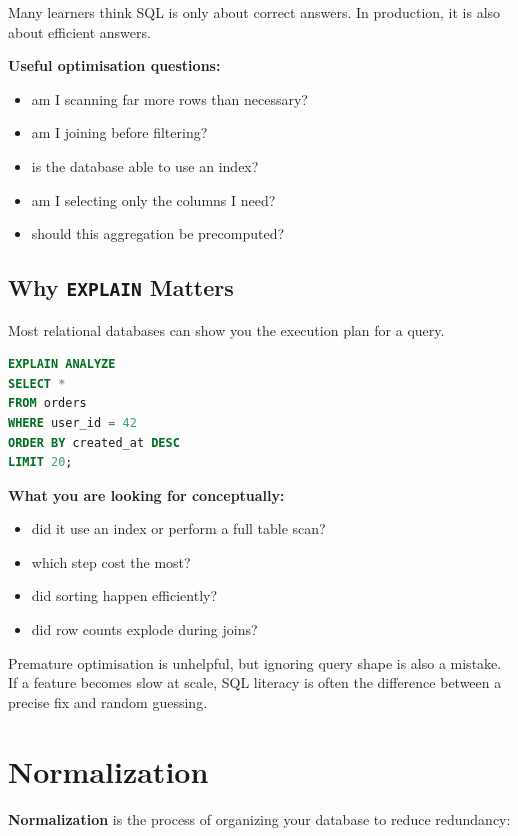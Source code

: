 \documentclass[12pt, a4paper, oneside]{book}
\begin{document}
Many learners think SQL is only about correct answers. In production, it is also about efficient answers.

\textbf{Useful optimisation questions:}
\begin{itemize}[leftmargin=2em]
    \item am I scanning far more rows than necessary?
    \item am I joining before filtering?
    \item is the database able to use an index?
    \item am I selecting only the columns I need?
    \item should this aggregation be precomputed?
\end{itemize}

\subsection{Why \texttt{EXPLAIN} Matters}
Most relational databases can show you the execution plan for a query.

\begin{lstlisting}[language=SQL, caption={Inspecting a query plan}]
EXPLAIN ANALYZE
SELECT *
FROM orders
WHERE user_id = 42
ORDER BY created_at DESC
LIMIT 20;
\end{lstlisting}

\textbf{What you are looking for conceptually:}
\begin{itemize}[leftmargin=2em]
    \item did it use an index or perform a full table scan?
    \item which step cost the most?
    \item did sorting happen efficiently?
    \item did row counts explode during joins?
\end{itemize}

\begin{warningbox}
Premature optimisation is unhelpful, but ignoring query shape is also a mistake. If a feature becomes slow at scale, SQL literacy is often the difference between a precise fix and random guessing.
\end{warningbox}

\section{Normalization}

\textbf{Normalization} is the process of organizing your database to reduce redundancy:
\end{document}
